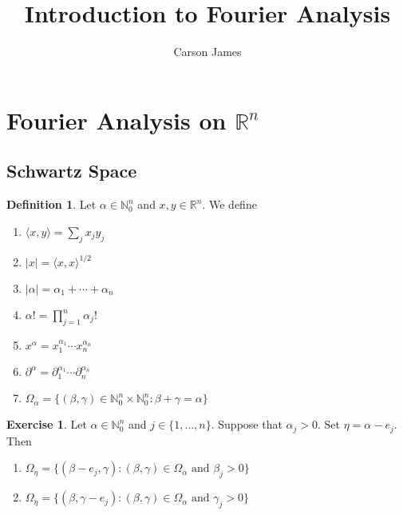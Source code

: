 \documentclass[12pt]{amsart}
\theoremstyle{definition}
\newtheorem{defn}[definition]{Definition}
\newtheorem{ex}[definition]{Exercise}
\newcommand{\p}{\partial}
\newcommand{\al}{\alpha}
\newcommand{\be}{\beta}
\newcommand{\gam}{\gamma}
\newcommand{\Om}{\Omega}
\newcommand{\N}{\mathbb{N}}
\newcommand{\R}{\mathbb{R}}
\renewcommand{\r}{\rangle}
\renewcommand{\l}{\langle}
\newcommand{\ld}[1]{\label{defn:#1}}
\begin{document}
	
	\title{Introduction to Fourier Analysis}
	\author{Carson James}
	\maketitle
	
	\tableofcontents
	
	\newpage
	\section{Fourier Analysis on $\R^n$}	
	
	\subsection{Schwartz Space}
	
	\begin{defn}
		\ld{100} Let $\al \in \N_0^n$ and $x, y \in \R^n$. We define 
		\begin{enumerate}
			\item $\l x , y\r  = \sum_{j}x_jy_j$
			\item $|x| = \l x, x\r^{1/2}$
			\item $|\al| = \al_1 + \cdots + \al_n$
			\item $\al! = \prod\limits_{j=1}^n \al_j!$
			\item $x^\al = x_1^{\al_1}\cdots x_n^{\al_n}$
			\item $\p^{\al} = \p_1^{\al_1} \cdots \p_n^{\al_n}$
			\item $\Om_{\al} = \{(\be, \gam) \in \N_0^n \times \N_0^n: \be + \gam = \al\}$
		\end{enumerate}
	\end{defn}

	\begin{ex}
		Let $\al \in \N_0^n$ and $j \in \{1, \ldots, n\}$. Suppose that $\al_j > 0$. Set $\eta = \al - e_j$. Then 
		\begin{enumerate}
			\item $\Om_{\eta} = \{(\be - e_j, \gam): (\be, \gam) \in \Om_{\al} \text{ and } \be_j > 0\}$
			\item $\Om_{\eta} = \{(\be, \gam - e_j): (\be, \gam) \in \Om_{\al} \text{ and } \gam_j > 0\}$
		\end{enumerate}
	\end{ex}
\end{document}
